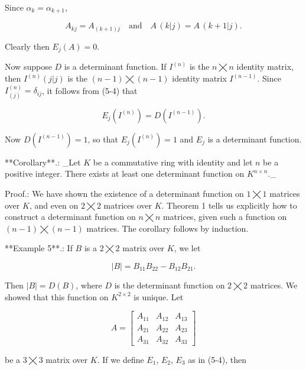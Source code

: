 Since \(\alpha_{k}=\alpha_{k+1}\),

\[A_{kj}=A_{(k+1)j}\quad\text{and}\quad A\,(k|j)=A\,(k+1|j).\]

Clearly then \(E_{j}(A)=0\).

Now suppose \(D\) is a determinant function. If \(I^{(n)}\) is the \(n\bigtimes n\) identity matrix, then \(I^{(n)}(j|j)\) is the \((n-1)\bigtimes(n-1)\) identity matrix \(I^{(n-1)}\). Since \(I^{(n)}_{(j)}=\delta_{ij}\), it follows from (5-4) that

\[E_{j}(I^{(n)})=D(I^{(n-1)}).\]

Now \(D(I^{(n-1)})=1\), so that \(E_{j}(I^{(n)})=1\) and \(E_{j}\) is a determinant function.

**Corollary**.: _Let \(K\) be a commutative ring with identity and let \(n\) be a positive integer. There exists at least one determinant function on \(K^{n\times n}\)._

Proof.: We have shown the existence of a determinant function on \(1\bigtimes 1\) matrices over \(K\), and even on \(2\bigtimes 2\) matrices over \(K\). Theorem 1 tells us explicitly how to construct a determinant function on \(n\bigtimes n\) matrices, given such a function on \((n-1)\bigtimes(n-1)\) matrices. The corollary follows by induction.

**Example 5**.: If \(B\) is a \(2\bigtimes 2\) matrix over \(K\), we let

\[|B|=B_{11}B_{22}-B_{12}B_{21}.\]

Then \(|B|=D(B)\), where \(D\) is the determinant function on \(2\bigtimes 2\) matrices. We showed that this function on \(K^{2\times 2}\) is unique. Let

\[A=\begin{bmatrix}A_{11}&A_{12}&A_{13}\\ A_{21}&A_{22}&A_{23}\\ A_{31}&A_{32}&A_{33}\end{bmatrix}\]

be a \(3\bigtimes 3\) matrix over \(K\). If we define \(E_{1}\), \(E_{2}\), \(E_{3}\) as in (5-4), then

